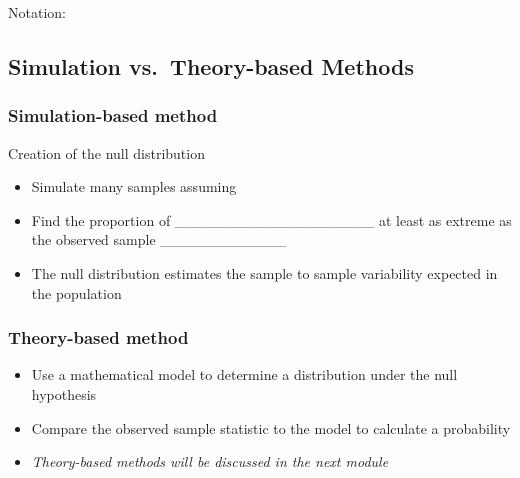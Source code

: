 \documentclass[
]{report}
\providecommand{\tightlist}{%
  \setlength{\itemsep}{0pt}\setlength{\parskip}{0pt}}
\begin{document}
Notation:

\vspace{0.2in}

\subsection*{Simulation vs.~Theory-based Methods}\label{simulation-vs.-theory-based-methods}

\subsubsection*{Simulation-based method}\label{simulation-based-method}


Creation of the null distribution

\begin{itemize}
\tightlist
\item
  Simulate many samples assuming
\end{itemize}

\vspace{0.2in}

\begin{itemize}
\item
  Find the proportion of \_\_\_\_\_\_\_\_\_\_\_\_\_\_\_\_\_\_\_ at least as extreme as the observed sample \_\_\_\_\_\_\_\_\_\_\_\_
\item
  The null distribution estimates the sample to sample variability expected in the population
\end{itemize}


\subsubsection*{Theory-based method}\label{theory-based-method}

\begin{itemize}
\item
  Use a mathematical model to determine a distribution under the null hypothesis
\item
  Compare the observed sample statistic to the model to calculate a probability
\item
  \emph{Theory-based methods will be discussed in the next module}
\end{itemize}
\end{document}
